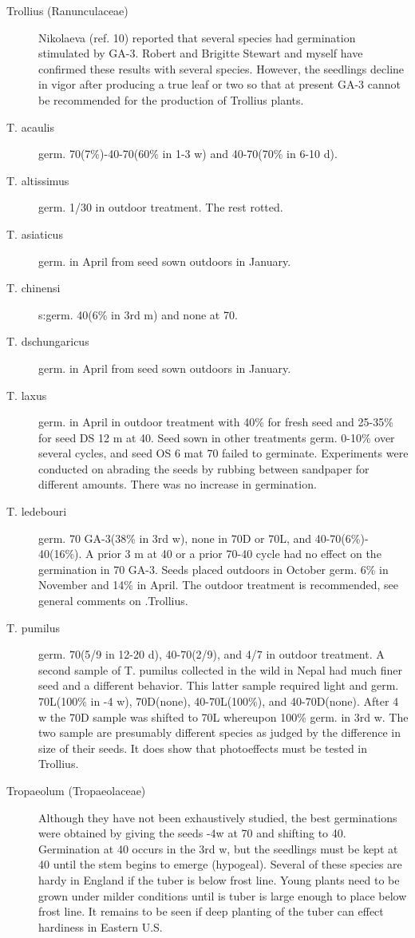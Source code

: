 \begin{description}
\item[Trollius (Ranunculaceae)] Nikolaeva (ref. 10) reported that several
species had germination stimulated by GA-3. Robert and Brigitte Stewart and myself
have confirmed these results with several species. However, the seedlings decline in
vigor after producing a true leaf or two so that at present GA-3 cannot be
recommended for the production of Trollius plants.
\item[T. acaulis] germ. 70(7\%)-40-70(60\% in 1-3 w) and 40-70(70\% in 6-10 d).
\item[T. altissimus] germ. 1/30 in outdoor treatment. The rest rotted.
\item[T. asiaticus] germ. in April from seed sown outdoors in January.
\item[T. chinensi]s:germ. 40(6\% in 3rd m) and none at 70.
\item[T. dschungaricus] germ. in April from seed sown outdoors in January.
\item[T. laxus] germ. in April in outdoor treatment with 40\% for fresh seed and 25-35\%
for seed DS 12 m at 40. Seed sown in other treatments germ. 0-10\% over several
cycles, and seed OS 6 mat 70 failed to germinate. Experiments were conducted on
abrading the seeds by rubbing between sandpaper for different amounts. There was
no increase in germination.
\item[T. ledebouri] germ. 70 GA-3(38\% in 3rd w), none in 70D or 70L, and 40-70(6\%)-
40(16\%). A prior 3 m at 40 or a prior 70-40 cycle had no effect on the germination in
70 GA-3. Seeds placed outdoors in October germ. 6\% in November and 14\% in April.
The outdoor treatment is recommended, see general comments on .Trollius.
\item[T. pumilus] germ. 70(5/9 in 12-20 d), 40-70(2/9), and 4/7 in outdoor treatment. A
second sample of T. pumilus collected in the wild in Nepal had much finer seed and a
different behavior. This latter sample required light and germ. 70L(100\% in -4 w),
70D(none), 40-70L(100\%), and 40-70D(none). After 4 w the 70D sample was shifted
to 70L whereupon 100\% germ. in 3rd w. The two sample are presumably different
species as judged by the difference in size of their seeds. It does show that
photoeffects must be tested in Trollius.

\item[Tropaeolum (Tropaeolaceae)] Although they have not been exhaustively
studied, the best germinations were obtained by giving the seeds -4w at 70 and
shifting to 40. Germination at 40 occurs in the 3rd w, but the seedlings must be kept at
40 until the stem begins to emerge (hypogeal). Several of these species are hardy in
England if the tuber is below frost line. Young plants need to be grown under milder
conditions until is tuber is large enough to place below frost line. It remains to be seen
if deep planting of the tuber can effect hardiness in Eastern U.S.


\end{description}
